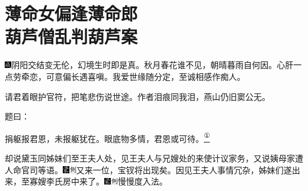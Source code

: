
\chapter{薄命女偏逢薄命郎\\葫芦僧乱判葫芦案}\label{part0008_split_000.htmlux5cux23calibre_pb_0}

{\includegraphics[width=3mm]{../Images/00005}\kaishu 阴阳交结变无伦，幻境生时即是真。秋月春花谁不见，朝晴暮雨自何因。心肝一点劳牵恋，可意偏长遇喜嗔。我爱世缘随分定，至诚相感作痴人。}

{\kaishu 请君着眼护官符，把笔悲伤说世途。作者泪痕同我泪，燕山仍旧窦公无。}

题曰：

捐躯报君恩，未报躯犹在。眼底物多情，君恩或可待。\href{../Text/part0008_split_000.html\#lnkback_1_a}{\textsuperscript{①}}

却说黛玉同姊妹们至王夫人处，见王夫人与兄嫂处的来使计议家务，又说姨母家遭人命官司等语。{\includegraphics[width=3mm]{../Images/00006}\includegraphics[width=3mm]{../Images/00011}\footnotesize \kaishu 又来一位，宝钗将出现矣。}因见王夫人事情冗杂，姊妹们遂出来，至寡嫂李氏房中来了。{\includegraphics[width=3mm]{../Images/00006}\includegraphics[width=3mm]{../Images/00011}\footnotesize \kaishu 慢慢度入法。}

